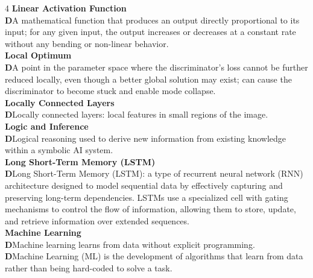 \documentclass[8pt]{extarticle}
\newcommand{\dtag}{\textcolor{definitioncolor}{\tiny\textbf{D}}\;}
\begin{document}
\begin{multicols}{4}
\vspace{2pt}\textbf{Linear Activation Function}\\
\dtag A mathematical function that produces an output directly proportional to its input; for any given input, the output increases or decreases at a constant rate without any bending or non-linear behavior.\\
\vspace{2pt}\textbf{Local Optimum}\\
\dtag A point in the parameter space where the discriminator's loss cannot be further reduced locally, even though a better global solution may exist; can cause the discriminator to become stuck and enable mode collapse.\\
\vspace{2pt}\textbf{Locally Connected Layers}\\
\dtag Locally connected layers: local features in small regions of the image.\\
\vspace{2pt}\textbf{Logic and Inference}\\
\dtag Logical reasoning used to derive new information from existing knowledge within a symbolic AI system.\\
\vspace{2pt}\textbf{Long Short-Term Memory (LSTM)}\\
\dtag Long Short-Term Memory (LSTM): a type of recurrent neural network (RNN) architecture designed to model sequential data by effectively capturing and preserving long-term dependencies. LSTMs use a specialized cell with gating mechanisms to control the flow of information, allowing them to store, update, and retrieve information over extended sequences.\\
\vspace{2pt}\textbf{Machine Learning}\\
\dtag Machine learning learns from data without explicit programming.\\
\dtag Machine Learning (ML) is the development of algorithms that learn from data rather than being hard-coded to solve a task.\\


\end{multicols}
\end{document}
